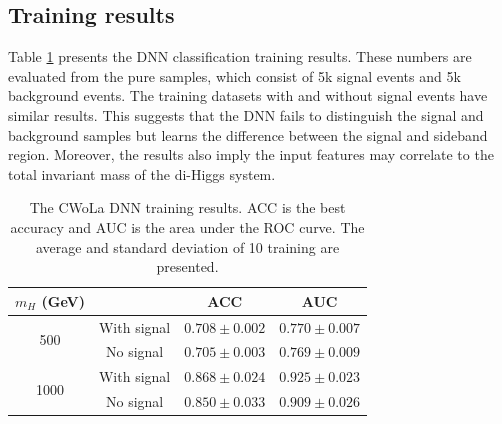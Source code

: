 \documentclass[12pt]{article}
\begin{document}
    \subsection{Training results}%
    \label{sub:training_results}
        Table \ref{tab:cwola_hunting_DNN_results} presents the DNN classification training results. These numbers are evaluated from the pure samples, which consist of 5k signal events and 5k background events. The training datasets with and without signal events have similar results. This suggests that the DNN fails to distinguish the signal and background samples but learns the difference between the signal and sideband region. Moreover, the results also imply the input features may correlate to the total invariant mass of the di-Higgs system.
        \begin{table}[htpb]
            \centering
            \caption{The CWoLa DNN training results. ACC is the best accuracy and AUC is the area under the ROC curve. The average and standard deviation of 10 training are presented.}
            \label{tab:cwola_hunting_DNN_results}
            \begin{tabular}{c|c|cc}
                $m_H$ (GeV)           &             & ACC               & AUC               \\ \hline
                \multirow{2}{*}{500}  & With signal & $0.708 \pm 0.002$ & $0.770 \pm 0.007$ \\
                                      & No signal   & $0.705 \pm 0.003$ & $0.769 \pm 0.009$ \\ \hline
                \multirow{2}{*}{1000} & With signal & $0.868 \pm 0.024$ & $0.925 \pm 0.023$ \\
                                      & No signal   & $0.850 \pm 0.033$ & $0.909 \pm 0.026$
            \end{tabular}
        \end{table}
\end{document}
